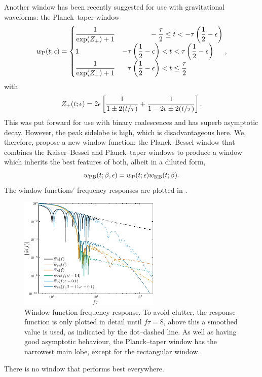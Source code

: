 Another window has been recently suggested for use with gravitational waveforms: the Planck--taper window \citep{Damour2000,McKechan2010}
\begin{equation}
w\sub{P}(t; \epsilon) = \begin{cases}
 {\displaystyle \recip{\exp(Z_+)+1}} & {\displaystyle \hphantom{\left(\recip{2} - \epsilon\right)}-\dfrac{\tau}{2} \leq t < -\tau\left(\recip{2} - \epsilon\right)} \\
 1 & {\displaystyle -\tau\left(\recip{2} - \epsilon\right) < t < \tau\left(\recip{2} - \epsilon\right)} \\
 {\displaystyle \recip{\exp(Z_-)+1}} & {\displaystyle \hphantom{-}\tau\left(\recip{2} - \epsilon\right) < t \leq \dfrac{\tau}{2}}
\end{cases},
\end{equation}
with
\begin{equation}
Z_\pm(t; \epsilon) = 2\epsilon\left[\dfrac{1}{1 \pm 2(t/\tau)} + \dfrac{1}{1 - 2\epsilon \pm 2(t/\tau)}\right].
\end{equation}
This was put forward for use with binary coalescences and has superb asymptotic decay. However, the peak sidelobe is high, which is disadvantageous here. We, therefore, propose a new window function: the Planck--Bessel window that combines the Kaiser--Bessel and Planck--taper windows to produce a window which inherits the best features of both, albeit in a diluted form,
\begin{equation}
w_\mathrm{PB}(t;\beta,\epsilon) = w_\mathrm{P}(t; \epsilon)w_\mathrm{KB}(t;\beta).
\end{equation}
The window functions' frequency responses are plotted in .
\begin{figure}
  \centering
  \includegraphics[width=0.6\textwidth]{./images/Fig_Response}
    \caption{Window function frequency response. To avoid clutter, the response function is only plotted in detail until $f\tau = 8$, above this a smoothed value is used, as indicated by the dot--dashed line. As well as having good asymptotic behaviour, the Planck--taper window has the narrowest main lobe, except for the rectangular window.}
    \label{fig:Response}
\end{figure}
There is no window that performs best everywhere.

